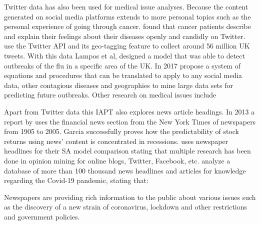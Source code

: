 Twitter data has also been used for medical issue analyses.
Because the content generated on social media platforms extends to more personal topics such as the personal experience of going through cancer.
\citet{Crannell2016} found that cancer patients describe and explain their feelings about their diseases openly and candidly on Twitter.
\citet{lampos2010flu} use the Twitter \ac{API} and its geo-tagging feature to collect around 56 million UK tweets.
With this data Lampos et al, designed a model that was able to detect outbreaks of the flu in a specific area of the UK\@.
In 2017 \citet{elkin2017network} propose a system of equations and procedures that can be translated to apply to any social media data, other contagious diseases and geographies to mine large data sets for predicting future outbreaks.
Other research on medical issues include~\citep{corley2010text, culotta2010towards, broniatowski2013national}

Apart from Twitter data this \ac{IAPT} also explores news article headings.
In 2013 a report by \citet{GarciaDiego2013SdR} uses the financial news section from the New York Times of newspapers from 1905 to 2005.
Garcia successfully proves how the predictability of stock returns using news' content is concentrated in recessions.
\citet{RameshbhaiChaudharyJashubhai2019Omon} uses newspaper headlines for their \ac{SA} model comparison stating that multiple research has been done in opinion mining for online blogs, Twitter, Facebook, etc.
\citet{GhasiyaPiyush2021ICNA} analyze a database of more than 100 thousand news headlines and articles for knowledge regarding the Covid-19 pandemic, stating that:

\begin{displayquote}
Newspapers are providing rich information to the public about various issues such as the discovery of a new strain of coronavirus, lockdown and other restrictions and government policies.
\end{displayquote}
